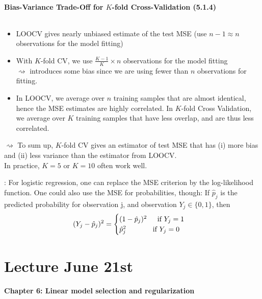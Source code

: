 \documentclass[11pt,a4paper,numbers=endperiod]{scrartcl}
\newcommand{\id}{\hspace*{4mm}}
\newcommand{\tit}[1]{\begin{large} \underline{\text{#1}}\end{large}}
\begin{document}
{\paragraph{Bias-Variance Trade-Off for $K$-fold Cross-Validation (5.1.4)}
$ $\\
\begin{itemize}
	\item LOOCV gives nearly unbiased estimate of the test MSE (use $n-1 \approx n$ observations for the model fitting)
	\item With $K$-fold CV, we use $\frac{K - 1}{K} \times n$ observations for the model fitting\\
	$\rightsquigarrow$ introduces some bias since we are using fewer than $n$ observations for fitting. 
	\item In LOOCV, we average over $n$ training samples that are almost identical, hence the MSE estimates are highly correlated. In $K$-fold Cross Validation, we average over $K$ training samples that have less overlap, and are thus less correlated. 
\end{itemize}
$\rightsquigarrow$ To sum up, $K$-fold CV gives an estimator of test MSE that has (i) more bias and (ii) less variance than the estimator from LOOCV.\\
In practice, $K = 5$ or $K = 10$ often work well.\\

\tit{Note}: For logistic regression, one can replace the MSE criterion by the log-likelihood function. One could also use the MSE for probabilities, though: If $\hat{p}_j$ is the predicted probability for observation j, and observation $Y_j \in \{0,1\}$, then \begin{align*}
	(Y_j - \hat{p}_j)^2 = \begin{cases}
	(1 - \hat{p}_j)^2 \id \text{ if } Y_j = 1\\
	\hat{p}_j^2 \id \id \id \text{ if } Y_j = 0
	\end{cases}\\
\end{align*}

\section{Lecture June 21st}

\paragraph{Chapter 6: Linear model selection and regularization}
$ $\\

}
\end{document}
